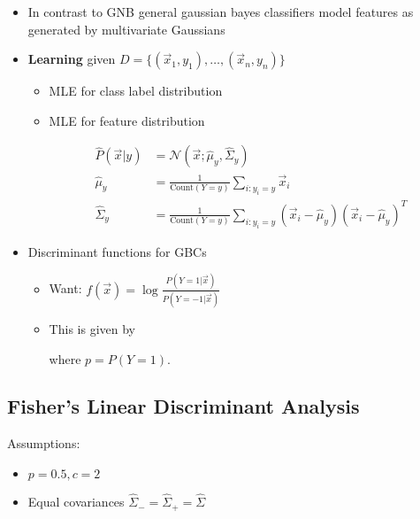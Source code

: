 \documentclass[8pt,a4paper]{scrartcl}
\begin{document}
\begin{multicols*}{3}
\begin{itemize}
\ncompaq
\item In contrast to GNB general gaussian bayes classifiers model features as generated by multivariate Gaussians

\item \textbf{Learning} given $D=\{(\vec{x}_1,y_1),\ldots,(\vec{x}_n,y_n)\}$
\begin{itemize}
\ncompaq
\item MLE for class label distribution

\item MLE for feature distribution

\begin{align*}
\hat{P}(\vec{x}|y)&=\mathcal{N}(\vec{x};\hat{\mu}_y,\hat{\Sigma}_y)\\
\hat{\mu}_y&=\frac{1}{\text{Count}(Y=y)}\sum\limits_{i:y_i=y}\vec{x}_i\\
\hat{\Sigma}_y&=\frac{1}{\text{Count}(Y=y)}\sum\limits_{i:y_i=y}(\vec{x}_i-\hat{\mu}_y)(\vec{x}_i-\hat{\mu}_y)^T
\end{align*}
\end{itemize}
\item Discriminant functions for GBCs
\begin{itemize}
\ncompaq
\item Want: $f(\vec{x})=\log\frac{P(Y=1|\vec{x})}{P(Y=-1|\vec{x})}$
\item This is given by


where $p=P(Y=1)$.
\end{itemize}

\end{itemize}

\subsection{Fisher's Linear Discriminant Analysis}

Assumptions:

\begin{itemize}
\ncompaq
\item $p=0.5, c = 2$
\item Equal covariances $\hat{\Sigma}_-=\hat{\Sigma}_+=\hat{\Sigma}$
\end{itemize}


\end{multicols*}
\end{document}
